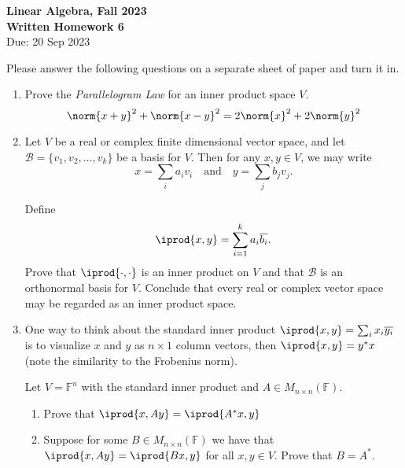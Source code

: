 \documentclass[11 pt]{article}
\newcommand{\F}{\mathbb{F}}
\newcommand{\B}{\mathcal{B}}
\begin{document}
\onehalfspacing
\begin{center}
\textbf{{\Large Linear Algebra, Fall 2023}\\
Written Homework 6}\\
Due: 20 Sep 2023
\end{center}

\noindent Please answer the following questions on a separate sheet of paper and turn it in.

\begin{enumerate}
\item Prove the {\it Parallelogram Law} for an inner product space $V$.
\[\norm{x+y}^2 + \norm{x-y}^2 = 2 \norm{x}^2 + 2 \norm{y}^2\]

\item Let $V$ be a real or complex finite dimensional vector space, and let $\B = \{v_1, v_2, \ldots, v_k\}$ be a basis for $V$. Then for any $x, y \in V$, we may write
\[x = \sum_i a_i v_i \quad \text{and} \quad y = \sum_j b_j v_j.\]

Define 
\[\iprod{x, y}= \sum_{i =1}^k a_i \overline{b_i}.\]
Prove that $\iprod{\cdot,\cdot}$ is an inner product on $V$ and that $\B$ is an orthonormal basis for $V$. Conclude that every real or complex vector space may be regarded as an inner product space.

\item One way to think about the standard inner product $\iprod{x,y} = \sum_{i}x_i\overline{y_i}$ is to visualize $x$ and $y$ as $n \times 1$ column vectors, then $\iprod{x,y} = y^*x$ (note the similarity to the Frobenius norm).

Let $V = \F^n$ with the standard inner product and $A \in M_{n \times n}(\F)$.
    \begin{enumerate}
    \item Prove that $\iprod{x,Ay} = \iprod{A^*x, y}$
    \item Suppose for some $B \in M_{n \times n}(\F)$ we have that $\iprod{x,Ay} = \iprod{Bx,y}$ for all $x,y \in V$. Prove that $B = A^*$.
    \end{enumerate}
\end{enumerate}
\end{document}
